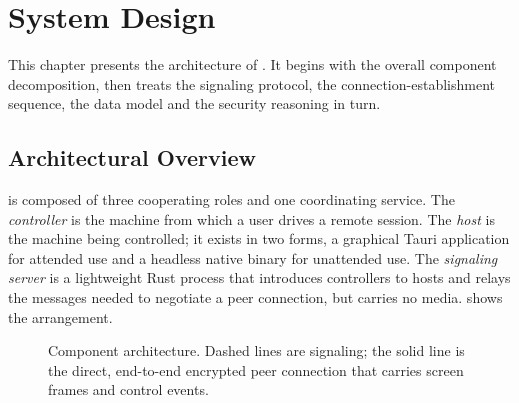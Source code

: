 \chapter{System Design}

This chapter presents the architecture of \updesk{}. It begins with the overall
component decomposition, then treats the signaling protocol, the
connection-establishment sequence, the data model and the security reasoning in
turn.

\section{Architectural Overview}

\updesk{} is composed of three cooperating roles and one coordinating service.
The \emph{controller} is the machine from which a user drives a remote session.
The \emph{host} is the machine being controlled; it exists in two forms, a
graphical Tauri application for attended use and a headless native binary for
unattended use. The \emph{signaling server} is a lightweight Rust process that
introduces controllers to hosts and relays the messages needed to negotiate a
peer connection, but carries no media.  shows the arrangement.

\begin{figure}[H]
\centering
{}
\caption{Component architecture. Dashed lines are signaling; the solid line is
the direct, end-to-end encrypted peer connection that carries screen frames and
control events.}
\label{fig:arch}
\end{figure}

